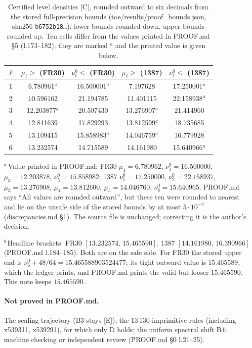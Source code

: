 \documentclass[11pt]{article}
\begin{document}
\begin{table}[h]\centering\small
\caption{Certified level densities [C], rounded outward to six decimals from the stored full-precision bounds (toe/results/proof\_bounds.json, sha256 \texttt{b6752b18\ldots}): lower bounds rounded down, upper bounds rounded up. Ten cells differ from the values printed in PROOF.md \S5 (l.173--182); they are marked $^{a}$ and the printed value is given below.}\label{tab:munu}
\begin{tabular}{ccccc}\toprule
$\ell$ & $\mu_\ell\ge$ (FR30) & $\nu^0_\ell\le$ (FR30) & $\mu_\ell\ge$ (1387) & $\nu^0_\ell\le$ (1387)\\\midrule
1 & 6.780961$^{a}$ & 16.500001$^{a}$ & 7.197628 & 17.250001$^{a}$\\
2 & 10.596162 & 21.194785 & 11.401115 & 22.158938$^{a}$\\
3 & 12.203877$^{a}$ & 20.507430 & 13.276907$^{a}$ & 21.414960\\
4 & 12.841639 & 17.829293 & 13.812599$^{a}$ & 18.735685\\
5 & 13.109415 & 15.858983$^{a}$ & 14.046759$^{a}$ & 16.779928\\
6 & 13.232574 & 14.715589 & 14.161980 & 15.640966$^{a}$\\\bottomrule
\end{tabular}
\par\smallskip\footnotesize\raggedright $^{a}$\,Value printed in PROOF.md: FR30 $\mu_1=6.780962$, $\nu^0_1=16.500000$, $\mu_3=12.203878$, $\nu^0_5=15.858982$; 1387 $\nu^0_1=17.250000$, $\nu^0_2=22.158937$, $\mu_3=13.276908$, $\mu_4=13.812600$, $\mu_5=14.046760$, $\nu^0_6=15.640965$. PROOF.md says ``All values are rounded outward'', but these ten were rounded to nearest and lie on the unsafe side of the stored bounds by at most $5\cdot10^{-7}$ (discrepancies.md \S1). The source file is unchanged; correcting it is the author's decision.
\par\smallskip $^{b}$\,Headline brackets: FR30 $[13.232574,\,15.465590]$, 1387 $[14.161980,\,16.390966]$ (PROOF.md l.184--185). Both are on the safe side. For FR30 the stored upper end is $\nu^0_6+48/64=15.465588903524477$; its tight outward value is $15.465589$, which the ledger prints, and PROOF.md prints the valid but looser $15.465590$. This note keeps $15.465590$.
\end{table}

\paragraph{Not proved in PROOF.md.} The scaling trajectory (B3 stays [E]); the 13\,130 imprimitive rules (including x539311, x539291), for which only D holds; the uniform spectral shift B4; machine checking or independent review (PROOF.md \S0 l.21--25).
\end{document}
